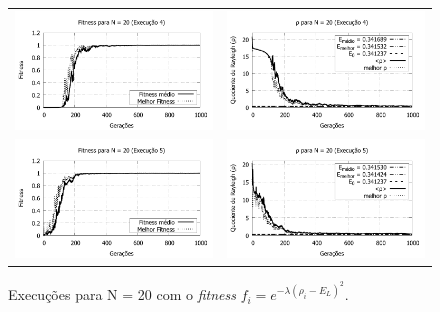 \begin{figure}[phtb]
\begin{tabular}{@{}cc@{}}
		\includegraphics[width=.40\textwidth]{figs/resultados/fitnessEL/N-20_E-4_fitness-extendido.pdf} &
    \includegraphics[width=.40\textwidth]{figs/resultados/fitnessEL/N-20_E-4_rho_extendido.pdf} \\
		\includegraphics[width=.40\textwidth]{figs/resultados/fitnessEL/N-20_E-5_fitness-extendido.pdf} &
    \includegraphics[width=.40\textwidth]{figs/resultados/fitnessEL/N-20_E-5_rho_extendido.pdf}
  \end{tabular}
  \caption{Execuções para N = 20 com o \textit{fitness} $f_i = e^{-\lambda(\rho_i - E_L)^2}$.}
	\label{fig:execucoes_N20_EL}
	\end{figure}
	

